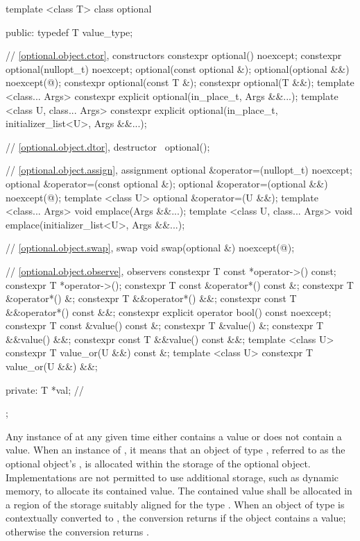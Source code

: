 %
\begin{codeblock}
template <class T> class optional {
public:
  typedef T value_type;

  // \ref{optional.object.ctor}, constructors
  constexpr optional() noexcept;
  constexpr optional(nullopt_t) noexcept;
  optional(const optional &);
  optional(optional &&) noexcept(@\seebelow@);
  constexpr optional(const T &);
  constexpr optional(T &&);
  template <class... Args> constexpr explicit optional(in_place_t, Args &&...);
  template <class U, class... Args>
    constexpr explicit optional(in_place_t, initializer_list<U>, Args &&...);

  // \ref{optional.object.dtor}, destructor
  ~optional();

  // \ref{optional.object.assign}, assignment
  optional &operator=(nullopt_t) noexcept;
  optional &operator=(const optional &);
  optional &operator=(optional &&) noexcept(@\seebelow@);
  template <class U> optional &operator=(U &&);
  template <class... Args> void emplace(Args &&...);
  template <class U, class... Args>
    void emplace(initializer_list<U>, Args &&...);

  // \ref{optional.object.swap}, swap
  void swap(optional &) noexcept(@\seebelow@);

  // \ref{optional.object.observe}, observers
  constexpr T const *operator->() const;
  constexpr T *operator->();
  constexpr T const &operator*() const &;
  constexpr T &operator*() &;
  constexpr T &&operator*() &&;
  constexpr const T &&operator*() const &&;
  constexpr explicit operator bool() const noexcept;
  constexpr T const &value() const &;
  constexpr T &value() &;
  constexpr T &&value() &&;
  constexpr const T &&value() const &&;
  template <class U> constexpr T value_or(U &&) const &;
  template <class U> constexpr T value_or(U &&) &&;

private:
  T *val; // \expos
};
\end{codeblock}

\pnum
Any instance of  at any given time either contains a value or does not contain a value.
When an instance of  ,
it means that an object of type , referred to as the optional object's ,
is allocated within the storage of the optional object.
Implementations are not permitted to use additional storage, such as dynamic memory, to allocate its contained value.
The contained value shall be allocated in a region of the  storage suitably aligned for the type .
When an object of type  is contextually converted to ,
the conversion returns  if the object contains a value;
otherwise the conversion returns .

